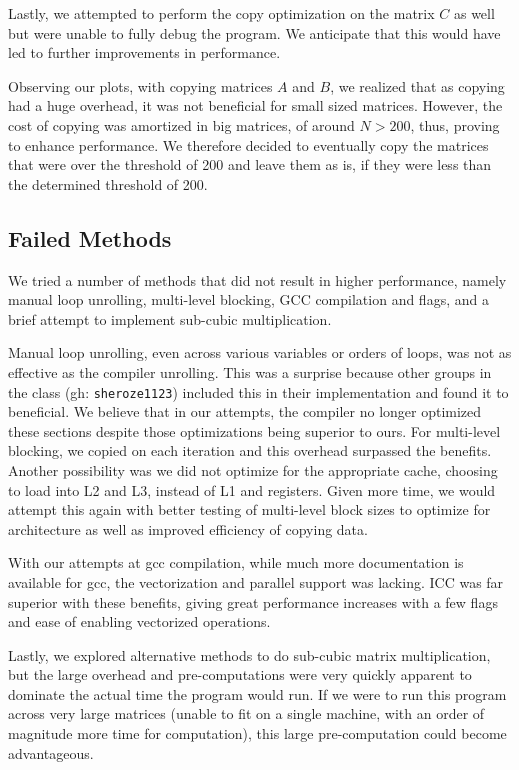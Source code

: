 \documentclass[12pt]{article}
\begin{document}
Lastly, we attempted to perform the copy optimization on the matrix $C$ as well but were unable to fully debug the program. We anticipate that this would have led to further improvements in performance.

Observing our plots, with copying matrices $A$ and $B$, we realized that as copying had a huge overhead, it was not beneficial for small sized matrices. However, the cost of copying was amortized in big matrices, of around $N>200$, thus, proving to enhance performance. We therefore decided to eventually copy the matrices that were over the threshold of 200 and leave them as is, if they were less than the determined threshold of 200.

\subsection{Failed Methods}
We tried a number of methods that did not result in higher performance, namely manual loop unrolling, multi-level blocking, GCC compilation and flags, and a brief attempt to implement sub-cubic multiplication. 

Manual loop unrolling, even across various variables or orders of loops, was not as effective as the compiler unrolling. This was a surprise because other groups in the class (gh: \texttt{sheroze1123}) included this in their implementation and found it to beneficial.  We believe that in our attempts, the compiler no longer optimized these sections despite those optimizations being superior to ours. For multi-level blocking, we copied on each iteration and this overhead surpassed the benefits. Another possibility was we did not optimize for the appropriate cache, choosing to load into L2 and L3, instead of L1 and registers. Given more time, we would attempt this again with better testing of multi-level block sizes to optimize for architecture as well as improved efficiency of copying data. 

With our attempts at gcc compilation, while much more documentation is available for gcc, the vectorization and parallel support was lacking. ICC was far superior with these benefits, giving great performance increases with a few flags and ease of enabling vectorized operations. 

Lastly, we explored alternative methods to do sub-cubic matrix multiplication, but the large overhead and pre-computations were very quickly apparent to dominate the actual time the program would run. If we were to run this program across very large matrices (unable to fit on a single machine, with an order of magnitude more time for computation), this large pre-computation could become advantageous.
\end{document}
